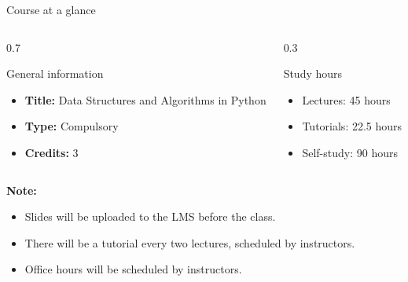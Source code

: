\documentclass[aspectratio=169]{beamer}
\begin{document}
\begin{frame}{Course at a glance}
  \begin{columns}[T]
    \begin{column}{0.7\textwidth}
      \begin{block}{General information}
        \begin{itemize}
          \item \textbf{Title:} Data Structures and Algorithms in Python
          \item \textbf{Type:} Compulsory
          \item \textbf{Credits:} 3
        \end{itemize}
      \end{block}
    \end{column}
    \begin{column}{0.3\textwidth}
      \begin{exampleblock}{Study hours}
        \begin{itemize}
          \item Lectures: 45 hours
          \item Tutorials: 22.5 hours
          \item Self-study: 90 hours
        \end{itemize}
      \end{exampleblock}
    \end{column}
  \end{columns}

  \vspace{0.5cm}
  {\color{red} \bf Note:}
  \begin{itemize}
    \item Slides will be uploaded to the LMS before the class.
    \item There will be a tutorial every two lectures, scheduled by instructors.
    \item Office hours will be scheduled by instructors.
  \end{itemize}
\end{frame}
\end{document}
